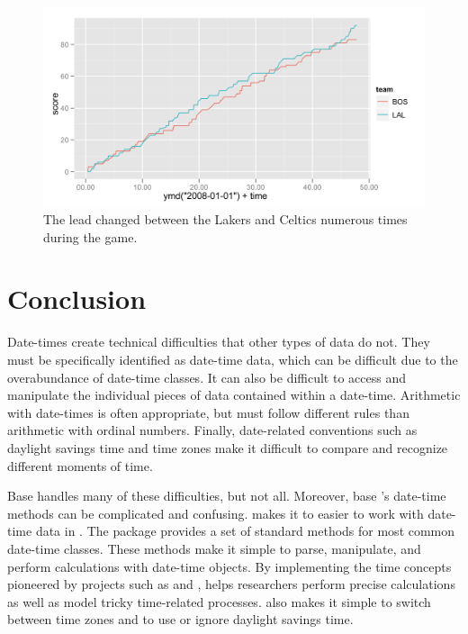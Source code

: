 \documentclass[article]{jss}
\begin{document}
\begin{figure}[htpb]
  \centering
  \includegraphics[width=\textwidth]{score-comparison.png}        
  \caption{The lead changed between the Lakers and Celtics numerous times during the game.}
  \label{fig:scores}
\end{figure}


\section{Conclusion}
Date-times create technical difficulties that other types of data do not. They must be specifically identified as date-time data, which can be difficult due to the overabundance of date-time classes. It can also be difficult to access and manipulate the individual pieces of data contained within a date-time. Arithmetic with date-times is often appropriate, but must follow different rules than arithmetic with ordinal numbers. Finally, date-related conventions such as daylight savings time and time zones make it difficult to compare and recognize different moments of time.

Base  handles many of these difficulties, but not all. Moreover, base 's date-time methods can be complicated and confusing.  makes it to easier to work with date-time data in . The package provides a set of standard methods for most common date-time classes. These methods make it simple to parse, manipulate, and perform calculations with date-time objects. By implementing the time concepts pioneered by projects such as  and ,  helps researchers perform precise calculations as well as model tricky time-related processes.  also makes it simple to switch between time zones and to use or ignore daylight savings time.
\end{document}
